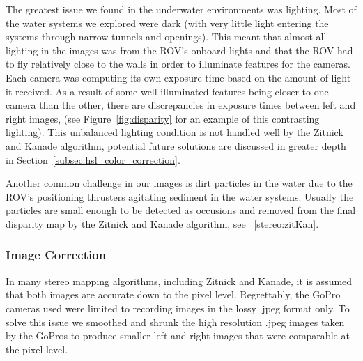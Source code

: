 \documentclass[twocolumn]{article}
\begin{document}
The greatest issue we found in the underwater environments was lighting.  Most of the water systems we explored were dark (with very little light entering the systems through narrow tunnels and openings).  This meant that almost all lighting in the images was from the ROV's onboard lights and that the ROV had to fly relatively close to the walls in order to illuminate features for the cameras.
Each camera was computing its own exposure time based on the amount of light it received.  
As a result of some well illuminated features being closer to one camera than the other, there are discrepancies in exposure times between left and right images, (see Figure~\ref{fig:disparity} for an example of this contrasting lighting).
  This unbalanced lighting condition is not handled well by the Zitnick and Kanade algorithm, potential future solutions are discussed in greater depth in Section~\ref{subsec:hsl_color_correction}.

Another common challenge in our images is dirt particles in the water due to the ROV's positioning thrusters agitating sediment in the water systems. Usually the particles are small enough to be detected as occusions and removed from the final disparity map by the Zitnick and Kanade algorithm, see ~\ref{stereo:zitKan}.

\subsubsection{Image Correction}
\label{subsec:image_correction}

In many stereo mapping algorithms, including Zitnick and Kanade, it is assumed that both images are accurate down to the pixel level.
Regrettably, the GoPro cameras used were limited to recording images in the lossy .jpeg format only.
To solve this issue we smoothed and shrunk the high resolution .jpeg images taken by the GoPros to produce smaller left and right images that were comparable at the pixel level.
\end{document}
